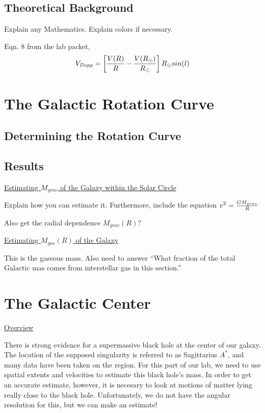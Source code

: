 \documentclass[12pt,preprint]{aastex}
\begin{document}
\subsection{Theoretical Background}
Explain any Mathematics. Explain colors if necessary.

Eqn. 8 from the lab packet,
\begin{equation}
V_{Dopp}=\left[{V(R) \over R} - {V(R_{\odot}) \over
  R_{\odot}}\right] R_{\odot}sin(l) 
\end{equation}

\section{The Galactic Rotation Curve}
\subsection{Determining the Rotation Curve}


\subsection{Results}
\underline{Estimating $M_{grav}$ of the Galaxy within the Solar Circle}

Explain how you can estimate it. Furthermore, include the equation 
$v^{2} = {GM_{grav} \over R}$

Also get the radial dependence $M_{grav}(R)$?

\underline{Estimating $M_{gas}(R)$ of the Galaxy}

This is the gaseous mass. Also need to answer ``What fraction of the
total Galactic mas comes from interstellar gas in this section.''

\section{The Galactic Center}
\underline{Overview}

There is strong evidence for a supermassive black hole at the center of
our galaxy. The location of the supposed singularity is referred to as
Sagittarius $A^{*}$, and many data have been taken on the region. For
this part of our lab, we need to use spatial extents and velocities to
estimate this black hole's mass. In order to get an accurate estimate,
however, it is necesary to look at motions of matter lying really close
to the black hole. Unfortunately, we do not have the angular resolution for this, but we can make an estimate!
\end{document}
